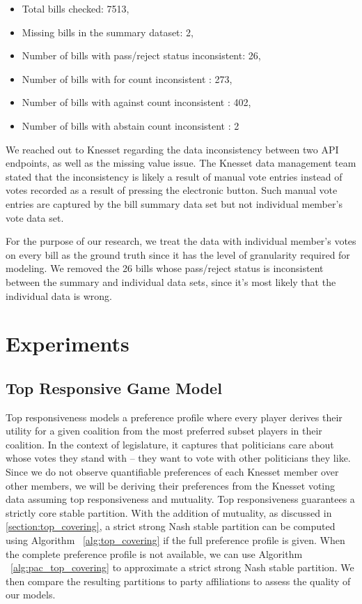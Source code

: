 \documentclass[letterpaper]{article} %
\theoremstyle{definition}
\begin{document}
\begin{itemize}
  \item Total bills checked: 7513,
  \item Missing bills in the summary dataset: 2,
  \item Number of bills with pass/reject status inconsistent: 26,
  \item Number of bills with for count inconsistent : 273,
  \item Number of bills with against count inconsistent : 402,
  \item Number of bills with abstain count inconsistent : 2
\end{itemize}

We reached out to Knesset regarding the data inconsistency between two API endpoints, as well as the missing value issue. The Knesset data management team stated that the inconsistency is likely a result of manual vote entries instead of votes recorded as a result of pressing the electronic button. Such manual vote entries are captured by the bill summary data set but not individual member's vote data set.

For the purpose of our research, we treat the data with individual member's votes on every bill as the ground truth since it has the level of granularity required for modeling. We removed the 26 bills whose pass/reject status is inconsistent between the summary and individual data sets, since it's most likely that the individual data is wrong.

\section{Experiments}

\subsection{Top Responsive Game Model}
Top responsiveness models a preference profile where every player derives their utility for a given coalition from the most preferred subset players in their coalition. In the context of legislature, it captures that politicians care about whose votes they stand with – they want to vote with other politicians they like. Since we do not observe quantifiable preferences of each Knesset member over other members, we will be deriving their preferences from the Knesset voting data assuming top responsiveness and mutuality. Top responsiveness guarantees a strictly core stable partition. With the addition of mutuality, as discussed in \ref{section:top_covering}, a strict strong Nash stable partition can be computed using Algorithm ~\ref{alg:top_covering} if the full preference profile is given. When the complete preference profile is not available, we can use Algorithm ~\ref{alg:pac_top_covering} to approximate a strict strong Nash stable partition. We then compare the resulting partitions to party affiliations to assess the quality of our models.
\end{document}
